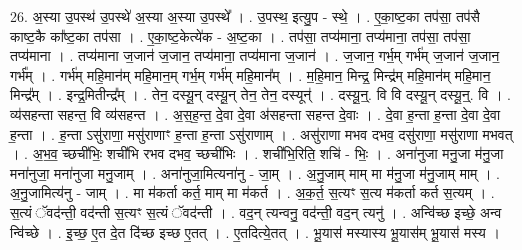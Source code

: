 \documentclass[17pt]{extarticle}
\begin{document}
26. अ॒स्या उ॒पस्थ॑ उ॒पस्थे॑ अ॒स्या अ॒स्या उ॒पस्थे᳚ । . उ॒पस्थ॒ इत्यु॒प - स्थे॒ । . ए॒का॒ष्ट॒का तप॑सा॒ तप॑सै काष्ट॒कै का᳚ष्ट॒का तप॑सा । . ए॒का॒ष्ट॒केत्ये॑क - अ॒ष्ट॒का । . तप॑सा॒ तप्य॑माना॒ तप्य॑माना॒ तप॑सा॒ तप॑सा॒ तप्य॑माना । . तप्य॑माना ज॒जान॑ ज॒जान॒ तप्य॑माना॒ तप्य॑माना ज॒जान॑ । . ज॒जान॒ गर्भ॒म् गर्भ॑म् ज॒जान॑ ज॒जान॒ गर्भ᳚म् । . गर्भ॑म् महि॒मान॑म् महि॒मान॒म् गर्भ॒म् गर्भ॑म् महि॒मान᳚म् । . म॒हि॒मान॒ मिन्द्र॒ मिन्द्र॑म् महि॒मान॑म् महि॒मान॒ मिन्द्र᳚म् । . इन्द्र॒मितीन्द्र᳚म् । . तेन॒ दस्यू॒न् दस्यू॒न् तेन॒ तेन॒ दस्यून्॑ । . दस्यू॒न्॒. वि वि दस्यू॒न् दस्यू॒न्॒. वि । . व्य॑सहन्ता सहन्त॒ वि व्य॑सहन्त । . अ॒स॒ह॒न्त॒ दे॒वा दे॒वा अ॑सहन्ता सहन्त दे॒वाः । . दे॒वा ह॒न्ता ह॒न्ता दे॒वा दे॒वा ह॒न्ता । . ह॒न्ता ऽसु॑राणा॒ मसु॑राणाꣳ ह॒न्ता ह॒न्ता ऽसु॑राणाम् । . असु॑राणा मभव दभव॒ दसु॑राणा॒ मसु॑राणा मभवत् । . अ॒भ॒व॒ च्छची॑भिः॒ शची॑भि रभव दभव॒ च्छची॑भिः । . शची॑भि॒रिति॒ शचि॑ - भिः॒ । . अना॑नुजा मनु॒जा म॑नु॒जा मना॑नुजा॒ मना॑नुजा मनु॒जाम् । . अना॑नुजा॒मित्यना॑नु - जा॒म् । . अ॒नु॒जाम् माम् मा म॑नु॒जा म॑नु॒जाम् माम् । . अ॒नु॒जामित्य॑नु - जाम् । . मा म॑कर्ता कर्त॒ माम् मा म॑कर्त । . अ॒क॒र्त॒ स॒त्यꣳ स॒त्य म॑कर्ता कर्त स॒त्यम् । . स॒त्यं ॅवद॑न्ती॒ वद॑न्ती स॒त्यꣳ स॒त्यं ॅवद॑न्ती । . वद॒न् त्यन्वनु॒ वद॑न्ती॒ वद॒न् त्यनु॑ । . अन्वि॑च्छ इच्छे॒ अन्व न्वि॑च्छे । . इ॒च्छ॒ ए॒त दे॒त दि॑च्छ इच्छ ए॒तत् । . ए॒तदित्ये॒तत् । . भू॒यास॑ मस्यास्य भू॒यास॑म् भू॒यास॑ मस्य । \newline
\end{document}
